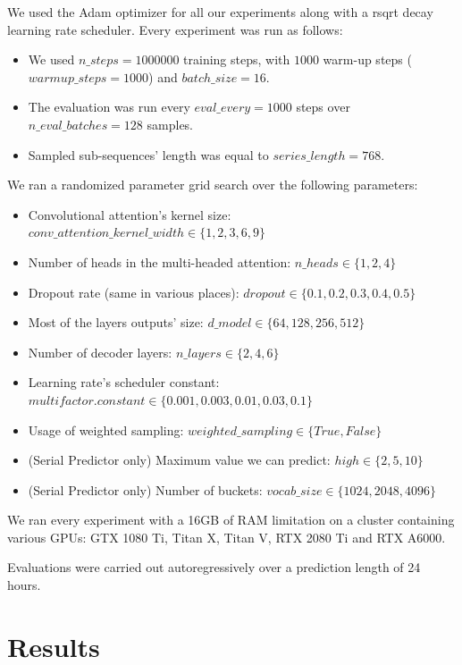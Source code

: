 \documentclass[en]{pracamgr}
\begin{document}
We used the Adam optimizer for all our experiments along with a rsqrt decay learning rate scheduler.
Every experiment was run as follows:
\begin{itemize}
	\item We used $n\_steps = 1000000$ training steps, with $1000$ warm-up steps  ($warmup\_steps = 1000$) and $batch\_size = 16$.
	\item The evaluation was run every $eval\_every = 1000$ steps over $n\_eval\_batches = 128$ samples.
	\item Sampled sub-sequences' length was equal to $series\_length = 768$.
\end{itemize}
We ran a randomized parameter grid search over the following parameters:
\begin{itemize}
	\item Convolutional attention's kernel size: $conv\_attention\_kernel\_width \in \{ 1, 2, 3, 6, 9 \}$
	\item Number of heads in the multi-headed attention: $ n\_heads \in \{ 1, 2, 4 \} $
	\item Dropout rate (same in various places): $dropout \in \{ 0.1, 0.2, 0.3, 0.4, 0.5 \} $
	\item Most of the layers outputs' size: $d\_model \in \{ 64, 128, 256, 512 \} $
	\item Number of decoder layers: $n\_layers \in \{ 2, 4, 6 \}$
	\item Learning rate's scheduler constant: $multifactor.constant \in \{ 0.001, 0.003, 0.01, 0.03, 0.1 \}$
	\item Usage of weighted sampling: $weighted\_sampling \in \{ True, False \}$
	\item (Serial Predictor only) Maximum value we can predict: $high \in \{2, 5, 10\}$ 
	\item (Serial Predictor only) Number of buckets: $vocab\_size \in \{1024, 2048, 4096\}$ 
\end{itemize}

We ran every experiment with a 16GB of RAM limitation on a cluster containing various GPUs: GTX 1080 Ti, Titan X, Titan V, RTX 2080 Ti and RTX A6000.


Evaluations were carried out autoregressively over a prediction length of 24 hours.



\section{Results}
\end{document}
